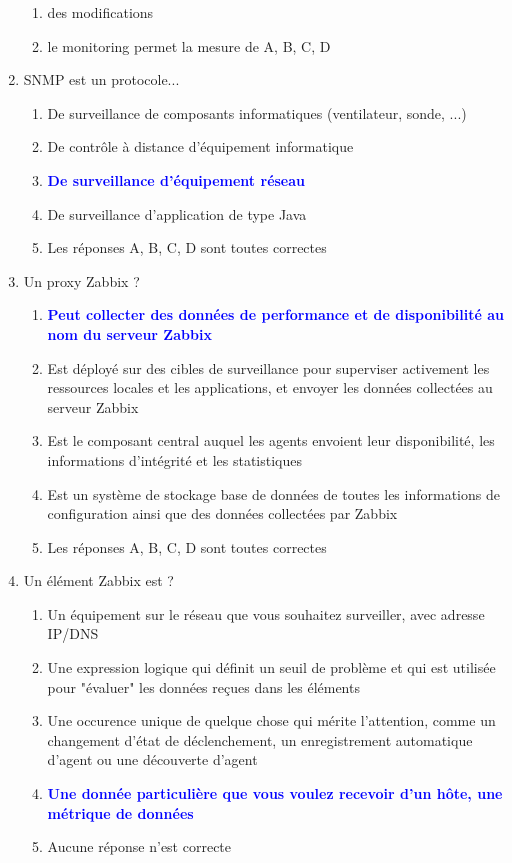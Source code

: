 \documentclass[a4paper]{article}
\begin{document}
\begin{enumerate}
\begin{enumerate}
        \item des modifications
        \item le monitoring permet la mesure de A, B, C, D
    \end{enumerate}
    \item SNMP est un protocole...
    \begin{enumerate}
        \item De surveillance de composants informatiques (ventilateur, sonde, ...)
        \item De contrôle à distance d'équipement informatique
        \item \textcolor{blue}{\textbf{De surveillance d'équipement réseau}}
        \item De surveillance d'application de type Java
        \item Les réponses A, B, C, D sont toutes correctes
    \end{enumerate}
    \item Un proxy Zabbix ?
    \begin{enumerate}
        \item \textcolor{blue}{\textbf{Peut collecter des données de performance et de disponibilité au nom du serveur Zabbix}}
        \item Est déployé sur des cibles de surveillance pour superviser activement les ressources locales et les applications, et envoyer les données collectées au serveur Zabbix
        \item Est le composant central auquel les agents envoient leur disponibilité, les informations d'intégrité et les statistiques
        \item Est un système de stockage base de données de toutes les informations de configuration ainsi que des données collectées par Zabbix
        \item Les réponses A, B, C, D sont toutes correctes
    \end{enumerate}
    \item Un élément Zabbix est ?
    \begin{enumerate}
        \item Un équipement sur le réseau que vous souhaitez surveiller, avec adresse IP/DNS
        \item Une expression logique qui définit un seuil de problème et qui est utilisée pour "évaluer" les données reçues dans les éléments
        \item Une occurence unique de quelque chose qui mérite l'attention, comme un changement d'état de déclenchement, un enregistrement automatique d'agent ou une découverte d'agent
        \item \textcolor{blue}{\textbf{Une donnée particulière que vous voulez recevoir d'un hôte, une métrique de données}}
        \item Aucune réponse n'est correcte
    \end{enumerate}
\end{enumerate}
\end{document}
